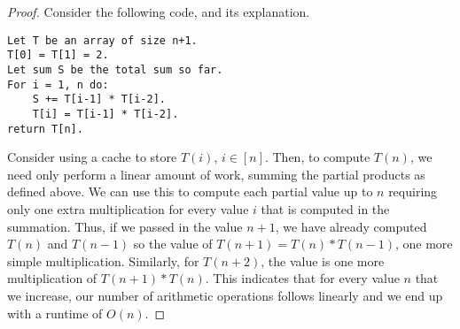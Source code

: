 \documentclass{article}
\begin{document}
\begin{enumerate}[label=(\alph*)]
		\begin{proof}
			Consider the following code, and its explanation.
			\begin{lstlisting}
Let T be an array of size n+1.
T[0] = T[1] = 2.
Let sum S be the total sum so far.
For i = 1, n do:
	S += T[i-1] * T[i-2].
	T[i] = T[i-1] * T[i-2].
return T[n].
			\end{lstlisting}
			Consider using a cache to store $T(i)$, $i\in [n]$.
			Then, to compute $T(n)$, we need only perform a linear amount of work, summing the partial products as defined above.
			We can use this to compute each partial value up to $n$ requiring only one extra multiplication for every value $i$ that is computed in the summation.  Thus, if we passed in the value $n+1$, we have already computed $T(n)$ and $T(n-1)$ so the value of $T(n+1) = T(n)*T(n-1)$, one more simple multiplication.  Similarly, for $T(n+2)$, the value is one more multiplication of $T(n+1)*T(n)$.  This indicates that for every value $n$ that we increase, our number of arithmetic operations follows linearly and we end up with a runtime of $O(n)$.
		\end{proof}
	\end{enumerate}
	
	
\end{document}
